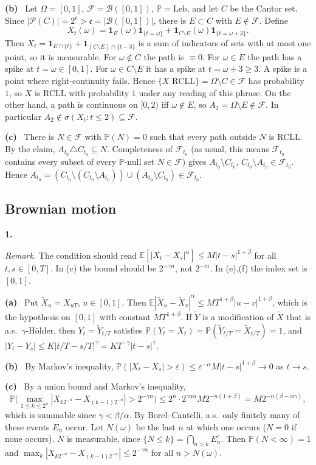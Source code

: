 \documentclass[11pt,a4paper]{article}
\newcommand{\E}{\mathbb{E}}
\renewcommand{\P}{\mathbb{P}}
\newcommand{\F}{\mathcal{F}}
\newcommand{\1}{\mathbf{1}}
\newcommand{\Leb}{\mathrm{Leb}}
\newcommand{\prob}[1]{\par\medskip\noindent\textbf{#1}\quad}
\newcommand{\sub}[1]{\par\smallskip\noindent\textbf{#1}\ }
\newcommand{\note}[1]{\par\noindent\emph{Remark.} #1}
\begin{document}
\sub{(b)} Let $\Omega=[0,1]$, $\F=\mathcal B([0,1])$, $\P=\Leb$, and let $C$ be the Cantor set. Since
$|\mathcal P(C)|=2^{\mathfrak c}>\mathfrak c=|\mathcal B([0,1])|$, there is $E\subset C$ with
$E\notin\F$. Define
\[X_t(\omega)=\1_{E}(\omega)\1_{\{t=\omega\}}+\1_{C\setminus E}(\omega)\1_{\{t=\omega+3\}}.\]
Then $X_t=\1_{E\cap\{t\}}+\1_{(C\setminus E)\cap\{t-3\}}$ is a sum of indicators of sets with at most one point, so it is
measurable. For $\omega\notin C$ the path is $\equiv0$. For $\omega\in E$ the path has a spike at $t=\omega\in[0,1]$. For
$\omega\in C\setminus E$ it has a spike at $t=\omega+3\ge3$. A spike is a point where right-continuity fails. Hence
$\{X\text{ RCLL}\}=\Omega\setminus C\in\F$ has probability $1$, so $X$ is RCLL with probability $1$ under any reading of
this phrase. On the other hand, a path is continuous on $[0,2)$ iff $\omega\notin E$, so
$A_2=\Omega\setminus E\notin\F$. In particular $A_2\notin\sigma(X_t:t\le 2)\subseteq\F$.

\sub{(c)} There is $N\in\F$ with $\P(N)=0$ such that every path outside $N$ is RCLL. By the claim,
$A_{t_0}\triangle C_{t_0}\subseteq N$. Completeness of $\F_{t_0}$ (as usual, this means $\F_{t_0}$ contains every subset of every
$\P$-null set $N\in\F$) gives $A_{t_0}\setminus C_{t_0},\,C_{t_0}\setminus A_{t_0}\in\F_{t_0}$. Hence
$A_{t_0}=(C_{t_0}\setminus(C_{t_0}\setminus A_{t_0}))\cup(A_{t_0}\setminus C_{t_0})\in\F_{t_0}$.

\subsection*{Brownian motion}

\prob{1.}
\note{The condition should read $\E[|X_t-X_s|^\alpha]\le M|t-s|^{1+\beta}$ for all $t,s\in[0,T]$. In (c) the
bound should be $2^{-\gamma n}$, not $2^{-m}$. In (e),(f) the index set is $[0,1]$.}

\sub{(a)} Put $\tilde X_u=X_{uT}$, $u\in[0,1]$. Then $\E|\tilde X_u-\tilde X_v|^\alpha\le
MT^{1+\beta}|u-v|^{1+\beta}$, which is the hypothesis on $[0,1]$ with constant $MT^{1+\beta}$. If
$\tilde Y$ is a modification of $\tilde X$ that is a.s.\ $\gamma$-H\"older, then
$Y_t=\tilde Y_{t/T}$ satisfies $\P(Y_t=X_t)=\P(\tilde Y_{t/T}=\tilde X_{t/T})=1$, and
$|Y_t-Y_s|\le K|t/T-s/T|^\gamma=KT^{-\gamma}|t-s|^\gamma$.

\sub{(b)} By Markov's inequality, $\P(|X_t-X_s|>\varepsilon)\le\varepsilon^{-\alpha}M|t-s|^{1+\beta}\to0$ as $t\to s$.

\sub{(c)} By a union bound and Markov's inequality,
\[
\P\Big(\max_{1\le k\le 2^n}|X_{k2^{-n}}-X_{(k-1)2^{-n}}|>2^{-\gamma n}\Big)
\le 2^n\cdot 2^{\gamma\alpha n}M2^{-n(1+\beta)}=M2^{-n(\beta-\alpha\gamma)},
\]
which is summable since $\gamma<\beta/\alpha$. By Borel--Cantelli, a.s.\ only finitely many of these
events $E_n$ occur. Let $N(\omega)$ be the last $n$ at which one occurs ($N=0$ if none occurs). $N$ is
measurable, since $\{N\le k\}=\bigcap_{n>k}E_n^c$. Then
$\P(N<\infty)=1$ and $\max_k|X_{k2^{-n}}-X_{(k-1)2^{-n}}|\le2^{-\gamma n}$ for all $n>N(\omega)$.
\end{document}
